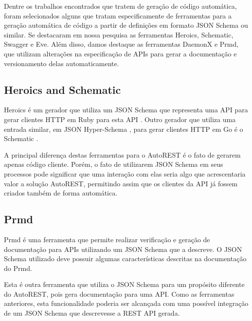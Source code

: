 Dentre os trabalhos encontrados que tratem de geração de código automática, foram selecionados alguns que tratam especificamente de ferramentas para a geração automática de código a partir de definições em formato JSON Schema ou similar. Se destacaram em nossa pesquisa as ferramentas Heroics, Schematic, Swagger e Eve. Além disso, damos destaque as ferramentas DaemonX e Prmd, que utilizam alterações na especificação de APIs para gerar a documentação e versionamento delas automaticamente.


\subsection{Heroics and Schematic}

Heroics é um gerador que utiliza um JSON Schema que representa uma API para gerar clientes HTTP em Ruby para esta API \cite{HEROICS}. Outro gerador que utiliza uma entrada similar, em JSON Hyper-Schema \cite{JSHYPERSCH}, para gerar clientes HTTP em Go é o Schematic \cite{SCHEMATIC}.

A principal diferença destas ferramentas para o AutoREST é o fato de gerarem apenas código cliente. Porém, o fato de utilizarem JSON Schema em seus processos pode significar que uma interação com elas seria algo que acrescentaria valor a solução AutoREST, permitindo assim que os clientes da API já fossem criados também de forma automática.


\subsection{Prmd}

Prmd \cite{PRMD} é uma ferramenta que permite realizar verificação e geração de documentação para APIs utilizando um JSON Schema que a descreve. O JSON Schema utilizado deve possuir algumas características descritas na documentação do Prmd.

Esta é outra ferramenta que utiliza o JSON Schema para um propósito diferente do AutoREST, pois gera documentação para uma API. Como as ferramentas anteriores, esta funcionalidade poderia ser alcançada com uma possível integração de um JSON Schema que descrevesse a REST API gerada.


